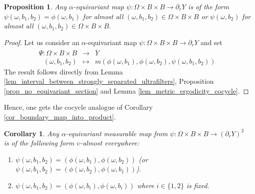 \documentclass{amsart}
\numberwithin{equation}{section}
\newtheorem{prop}[thm]{Proposition}
\newtheorem{cor}[thm]{Corollary}
\theoremstyle{definition}
\def\bar{\overline}
\begin{document}
    \begin{prop}
        Any $\alpha$-equivariant map $\psi:\Omega\times B\times B\rightarrow\partial_r Y$ is of the form $\psi(\omega,b_1,b_2)=\phi(\omega,b_1)$ for almost all $(\omega,b_1,b_2)\in \Omega\times B\times B$ or $\psi(\omega,b_2)$ for almost all $(\omega,b_1,b_2)\in \Omega\times B\times B$.
    \end{prop}
    \begin{proof}
        Let us consider an $\alpha$-equivariant map  $\psi:\Omega\times B\times B\rightarrow\partial_r Y$   and set 
        \begin{eqnarray*}
            \Psi: \Omega\times B\times B &\rightarrow& \bar Y\\
            \ \ \ (\omega,b_1,b_2)&\mapsto& m(\phi(\omega,b_1),\phi(\omega,b_2),\psi(\omega,b_1,b_2))
        \end{eqnarray*}
        The result follows directly from Lemma \ref{lem_interval_between_strongly_separated_ultrafilters}, Proposition \ref{prop_no_equivariant_section} and  Lemma \ref{lem_metric_ergodicity_cocycle}.
    \end{proof}
Hence, one gets the cocycle analogue of Corollary \ref{cor_boundary_map_into_product}.
    \begin{cor}\label{cor_boundary_map_into_product_cocycle}
Any $\alpha$-equivariant measurable map from $\psi: \Omega\times B\times B\rightarrow (\partial_r Y)^2$ is of the following form $\upsilon$-almost everywhere: 
\begin{enumerate}
 \item $\psi(\omega,b_1,b_2)=(\phi(\omega,b_1),\phi(\omega,b_2))$ (or $\psi(\omega,b_1,b_2)=(\phi(\omega,b_2),\phi(\omega,b_1))$).
 \item $\psi(\omega,b_1,b_2)=(\phi(\omega,b_i),\phi(\omega,b_i))$ where $i\in\{1,2\}$ is fixed.
\end{enumerate}
\end{cor}

\end{document}
